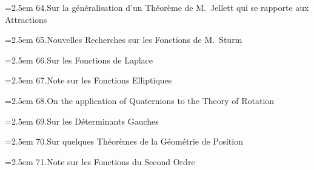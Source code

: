 \documentclass[11pt]{article}
\begin{document}
\noindent\hangindent=2.5em
64.\quad Sur la g\'en\'eralisation d'un Th\'eor\`eme de M.\ Jellett qui se rapporte aux Attractions\par
\hspace{1.5em}{\small Liouville, t.~xiii.\ (1848), pp.~264--268}\par

\noindent\hangindent=2.5em
65.\quad Nouvelles Recherches sur les Fonctions de M.\ Sturm\par
\hspace{1.5em}{\small Liouville, t.~xiii.\ (1848), pp.~269--274}\par

\noindent\hangindent=2.5em
66.\quad Sur les Fonctions de Laplace\par
\hspace{1.5em}{\small Liouville, t.~xiii.\ (1848), pp.~275--280}\par

\noindent\hangindent=2.5em
67.\quad Note sur les Fonctions Elliptiques\par
\hspace{1.5em}{\small Crelle, t.~xxxvii.\ (1848), pp.~58--60}\par

\noindent\hangindent=2.5em
68.\quad On the application of Quaternions to the Theory of Rotation\par
\hspace{1.5em}{\small Phil.\ Mag.\ t.~xxxiii.\ (1848), pp.~196--200}\par

\noindent\hangindent=2.5em
69.\quad Sur les D\'eterminants Gauches\par
\hspace{1.5em}{\small Crelle, t.~xxxviii.\ (1848), pp.~93--96}\par

\noindent\hangindent=2.5em
70.\quad Sur quelques Th\'eor\`emes de la G\'eom\'etrie de Position\par
\hspace{1.5em}{\small Crelle, t.~xxxviii.\ (1848), pp.~97--104}\par

\noindent\hangindent=2.5em
71.\quad Note sur les Fonctions du Second Ordre\par
\hspace{1.5em}{\small Crelle, t.~xxxviii.\ (1848), pp.~105, 106}\par
\end{document}
